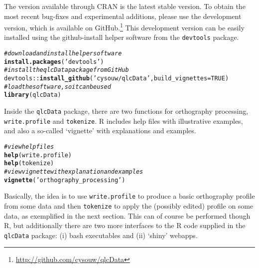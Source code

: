 \documentclass[output=inprep,
		biblatex
		]{LSP/langsci}\usepackage[]{graphicx}\usepackage[]{color}
\makeatletter
\newcommand{\hlnum}[1]{\textcolor[rgb]{0.686,0.059,0.569}{#1}}%
\newcommand{\hlstr}[1]{\textcolor[rgb]{0.192,0.494,0.8}{#1}}%
\newcommand{\hlcom}[1]{\textcolor[rgb]{0.678,0.584,0.686}{\textit{#1}}}%
\newcommand{\hlopt}[1]{\textcolor[rgb]{0,0,0}{#1}}%
\newcommand{\hlstd}[1]{\textcolor[rgb]{0.345,0.345,0.345}{#1}}%
\newcommand{\hlkwc}[1]{\textcolor[rgb]{0.333,0.667,0.333}{#1}}%
\newcommand{\hlkwd}[1]{\textcolor[rgb]{0.737,0.353,0.396}{\textbf{#1}}}%
\newenvironment{kframe}{%
 \def\at@end@of@kframe{}%
 \ifinner\ifhmode%
  \def\at@end@of@kframe{\end{minipage}}%
  \begin{minipage}{\columnwidth}%
 \fi\fi%
 \def\FrameCommand##1{\hskip\@totalleftmargin \hskip-\fboxsep
 \colorbox{shadecolor}{##1}\hskip-\fboxsep
     \hskip-\linewidth \hskip-\@totalleftmargin \hskip\columnwidth}%
 \MakeFramed {\advance\hsize-\width
   \@totalleftmargin\z@ \linewidth\hsize
   \@setminipage}}%
 {\par\unskip\endMakeFramed%
 \at@end@of@kframe}
\newenvironment{knitrout}{}{} %
\makeatother
\begin{document}
The version available through CRAN is the latest stable version.
To obtain the most recent bug-fixes and experimental additions, please use the
development version, which is available on
GitHub.\footnote{\url{http://github.com/cysouw/qlcData}} This development
version can be easily installed using the github-install helper software from the
\texttt{devtools} package.

\begin{knitrout}\footnotesize
{}\color{fgcolor}\begin{kframe}
\begin{alltt}
\hlcom{# download and install helper software}
\hlkwd{install.packages}\hlstd{(}\hlstr{'devtools'}\hlstd{)}
\hlcom{# install the qlcData package from GitHub}
\hlstd{devtools}\hlopt{::}\hlkwd{install_github}\hlstd{(}\hlstr{'cysouw/qlcData'}\hlstd{,} \hlkwc{build_vignettes} \hlstd{=} \hlnum{TRUE}\hlstd{)}
\hlcom{# load the software, so it can be used }
\hlkwd{library}\hlstd{(qlcData)}
\end{alltt}
\end{kframe}
\end{knitrout}

Inside the \texttt{qlcData} package, there are two functions for
orthography processing, \texttt{write.profile} and \texttt{tokenize}. R includes
help files with illustrative examples, and also a so-called `vignette' with
explanations and examples.

\begin{knitrout}\footnotesize
{}\color{fgcolor}\begin{kframe}
\begin{alltt}
\hlcom{# view help files}
\hlkwd{help}\hlstd{(write.profile)}
\hlkwd{help}\hlstd{(tokenize)}
\hlcom{# view vignette with explanation and examples}
\hlkwd{vignette}\hlstd{(}\hlstr{'orthography_processing'}\hlstd{)}
\end{alltt}
\end{kframe}
\end{knitrout}

Basically, the idea is to use \texttt{write.profile} to produce a
basic orthography profile from some data and then \texttt{tokenize} to apply the
(possibly edited) profile on some data, as exemplified in the next section. This
can of course be performed though R, but additionally there are two more
interfaces to the R code supplied in the \texttt{qlcData} package: (i) bash
executables and (ii) `shiny' webapps.
\end{document}
